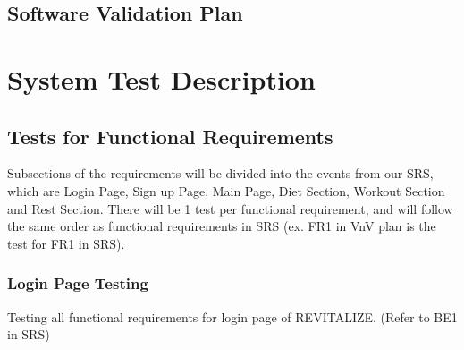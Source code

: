 \documentclass[12pt, titlepage]{article}
\begin{document}
\subsection{Software Validation Plan}


\section{System Test Description}

\subsection{Tests for Functional Requirements}

Subsections of the requirements will be divided into the events from our SRS, which are Login Page, Sign up Page, Main Page, Diet Section, Workout Section and Rest Section. There will be 1 test per functional requirement, and will follow the same order as functional requirements in SRS (ex. FR1 in VnV plan is the test for FR1 in SRS).

\subsubsection{Login Page Testing}

Testing all functional requirements for login page of REVITALIZE. (Refer to BE1 in SRS)
\end{document}
